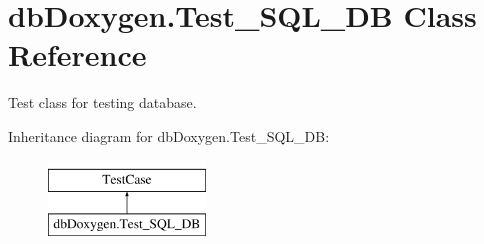 \hypertarget{classdbDoxygen_1_1Test__SQL__DB}{\section{db\-Doxygen.\-Test\-\_\-\-S\-Q\-L\-\_\-\-D\-B Class Reference}
\label{classdbDoxygen_1_1Test__SQL__DB}
}


Test class for testing database.  


Inheritance diagram for db\-Doxygen.\-Test\-\_\-\-S\-Q\-L\-\_\-\-D\-B\-:\begin{figure}[H]
\begin{center}
\leavevmode
\includegraphics[height=2.000000cm]{classdbDoxygen_1_1Test__SQL__DB}
\end{center}
\end{figure}
